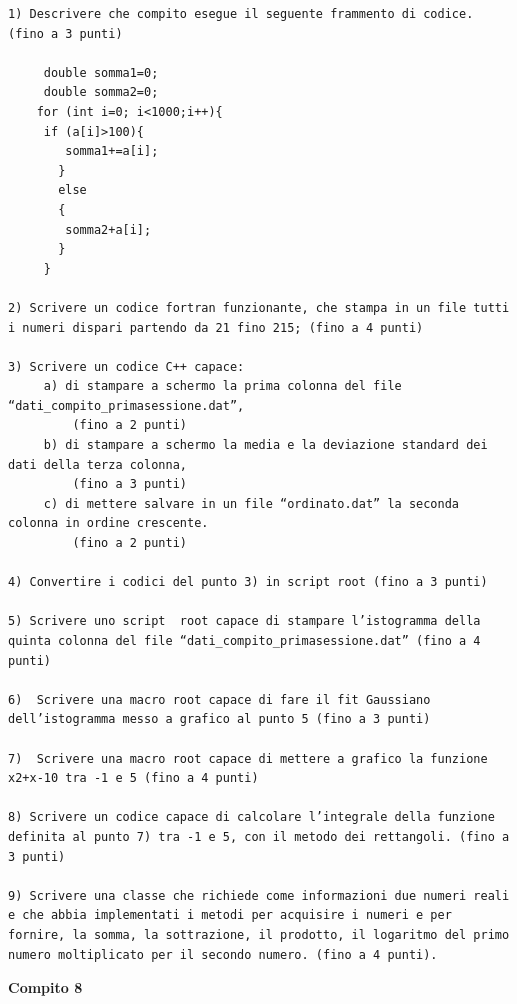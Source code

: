 \documentclass[11pt,fleqn]{book} %
\begin{document}
\begin{verbatim}
1) Descrivere che compito esegue il seguente frammento di codice. (fino a 3 punti)

     double somma1=0;
     double somma2=0;
    for (int i=0; i<1000;i++){
     if (a[i]>100){
        somma1+=a[i];
       }
       else
       {
        somma2+a[i];
       }
     }
       
2) Scrivere un codice fortran funzionante, che stampa in un file tutti i numeri dispari partendo da 21 fino 215; (fino a 4 punti)

3) Scrivere un codice C++ capace:
     a) di stampare a schermo la prima colonna del file “dati_compito_primasessione.dat”, 
         (fino a 2 punti)
     b) di stampare a schermo la media e la deviazione standard dei dati della terza colonna,
         (fino a 3 punti)
     c) di mettere salvare in un file “ordinato.dat” la seconda colonna in ordine crescente.
         (fino a 2 punti)

4) Convertire i codici del punto 3) in script root (fino a 3 punti)

5) Scrivere uno script  root capace di stampare l’istogramma della 
quinta colonna del file “dati_compito_primasessione.dat” (fino a 4 punti)

6)  Scrivere una macro root capace di fare il fit Gaussiano 
dell’istogramma messo a grafico al punto 5 (fino a 3 punti)

7)  Scrivere una macro root capace di mettere a grafico la funzione 
x2+x-10 tra -1 e 5 (fino a 4 punti)

8) Scrivere un codice capace di calcolare l’integrale della funzione 
definita al punto 7) tra -1 e 5, con il metodo dei rettangoli. (fino a 3 punti)

9) Scrivere una classe che richiede come informazioni due numeri reali 
e che abbia implementati i metodi per acquisire i numeri e per 
fornire, la somma, la sottrazione, il prodotto, il logaritmo del primo 
numero moltiplicato per il secondo numero. (fino a 4 punti).
\end{verbatim}


\textbf{Compito 8}
\end{document}
